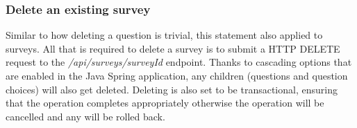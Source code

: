 \subsubsection*{Delete an existing survey}

Similar to how deleting a question is trivial, this statement also applied to surveys.
All that is required to delete a survey is to submit a HTTP DELETE request to the \textit{/api/surveys/{surveyId}} endpoint.
Thanks to cascading options that are enabled in the Java Spring application, any children (questions and question choices) will also
get deleted.
Deleting is also set to be transactional, ensuring that the operation completes appropriately otherwise the operation will be cancelled
and any will be rolled back.
